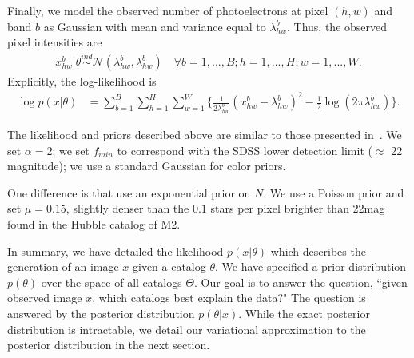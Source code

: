Finally, we model the observed number of photoelectrons at pixel $(h,w)$ and band $b$ as Gaussian
with mean and variance equal to $\lambda^b_{hw}$. 
Thus, the observed pixel intensities are
\begin{align}
  x_{hw}^b | \theta \overset{ind}{\sim} \mathcal{N}(\lambda^b_{hw}, \lambda^b_{hw})
  \quad\forall b = 1, ..., B; h = 1,..., H; w = 1, ..., W. 
\end{align}
Explicitly, the log-likelihood is
\begin{align}
    \log p(x | \theta) &= \sum_{b = 1}^{B} \sum_{h = 1}^H \sum_{w = 1}^W 
        \Big\{\frac{1}{2\lambda^b_{hw}}(x_{hw}^b  - \lambda^b_{hw})^2 - 
               \frac{1}{2}\log(2\pi\lambda^b_{hw})\Big\}
    \label{eq:loglik}.
\end{align}

The likelihood and priors described above are similar to those
presented in~\cite{Portillo_2017, Feder_2019}. We set $\alpha = 2$; we set 
$f_{min}$ to correspond with the SDSS 
lower detection limit ($\approx$ 22 magnitude); we use a standard Gaussian for color priors. 

One difference is that \cite{Portillo_2017, Feder_2019} use an exponential prior on $N$. We use a Poisson prior and set $\mu = 0.15$, slightly denser than the $0.1$ stars per pixel 
brighter than 22mag found in the Hubble catalog of M2. 

In summary, we have detailed the likelihood
$p(x | \theta)$ which describes the generation of an image $x$ given a catalog $\theta$. We have specified a prior distribution $p(\theta)$ over the space 
of all catalogs $\Theta$. 
Our goal is to answer the question, ``given observed image $x$, which 
catalogs best explain the data?"
The question is answered by the posterior distribution $p(\theta | x)$. While 
the exact posterior distribution is intractable, we detail our variational approximation to the posterior distribution in the next section. 